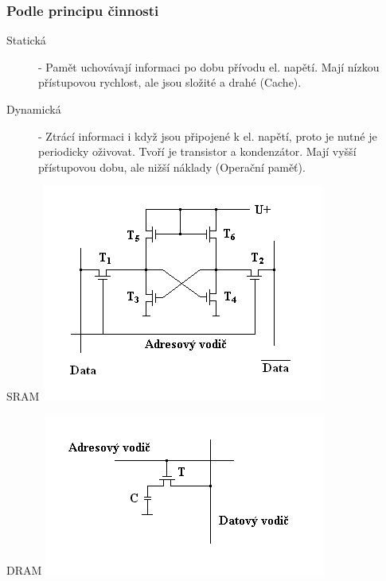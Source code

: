 \subsubsection{Podle principu činnosti}
\begin{description}
  \item[Statická] - Pamět uchovávají informaci po dobu přívodu el. napětí.
    Mají nízkou přístupovou rychlost, ale jsou složité a drahé (Cache).
  \item[Dynamická] - Ztrácí informaci i když jsou připojené k el. napětí, proto je nutné je periodicky oživovat.
    Tvoří je transistor a kondenzátor. Mají vyšší přístupovou dobu, ale nižší náklady (Operační paměť).
\end{description}
\begin{multicols}{2}\centering
  SRAM
  \includegraphics[width=\linewidth]{TVY-POS/Polovodicove-pameti/SRAM.png}
  \columnbreak\centering

  DRAM
  \includegraphics[width=\linewidth]{TVY-POS/Polovodicove-pameti/DRAM.png}
\end{multicols}
